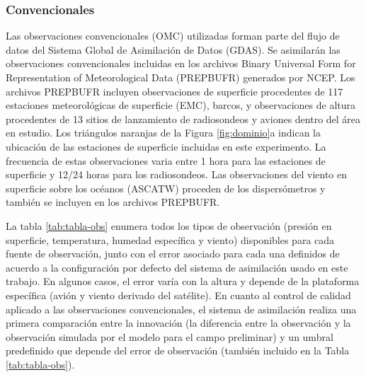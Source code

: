 \documentclass[12pt,oneside,a4paper]{reedthesis}
\begin{document}
\hypertarget{convencionales}{%
\subsubsection{Convencionales}\label{convencionales}}

Las observaciones convencionales (OMC) utilizadas forman parte del flujo de datos del Sistema Global de Asimilación de Datos (GDAS). Se asimilarán las observaciones convencionales incluidas en los archivos Binary Universal Form for Representation of Meteorological Data (PREPBUFR) generados por NCEP. Los archivos PREPBUFR incluyen observaciones de superficie procedentes de 117 estaciones meteorológicas de superficie (EMC), barcos, y observaciones de altura procedentes de 13 sitios de lanzamiento de radiosondeos y aviones dentro del área en estudio. Los triángulos naranjas de la Figura \ref{fig:dominio}a indican la ubicación de las estaciones de superficie incluidas en este experimento. La frecuencia de estas observaciones varia entre 1 hora para las estaciones de superficie y 12/24 horas para los radiosondeos. Las observaciones del viento en superficie sobre los océanos (ASCATW) proceden de los dispersómetros y también se incluyen en los archivos PREPBUFR.

La tabla \ref{tab:tabla-obs} enumera todos los tipos de observación (presión en superficie, temperatura, humedad específica y viento) disponibles para cada fuente de observación, junto con el error asociado para cada una definidos de acuerdo a la configuración por defecto del sistema de asimilación usado en este trabajo. En algunos casos, el error varía con la altura y depende de la plataforma específica (avión y viento derivado del satélite). En cuanto al control de calidad aplicado a las observaciones convencionales, el sistema de asimilación realiza una primera comparación entre la innovación (la diferencia entre la observación y la observación simulada por el modelo para el campo preliminar) y un umbral predefinido que depende del error de observación (también incluido en la Tabla \ref{tab:tabla-obs}).
\end{document}

